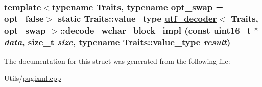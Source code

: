 \hypertarget{structutf__decoder_56b161067860fde1ed534ac3b7399e36}{
\subsubsection[decode\_\-wchar\_\-block\_\-impl]{\setlength{\rightskip}{0pt plus 5cm}template$<$typename Traits, typename opt\_\-swap = opt\_\-false$>$ static Traits::value\_\-type \hyperlink{structutf__decoder}{utf\_\-decoder}$<$ Traits, opt\_\-swap $>$::decode\_\-wchar\_\-block\_\-impl (const uint16\_\-t $\ast$ {\em data}, size\_\-t {\em size}, typename Traits::value\_\-type {\em result})}}
\label{structutf__decoder_56b161067860fde1ed534ac3b7399e36}




The documentation for this struct was generated from the following file:\begin{CompactItemize}
\item 
Utils/\hyperlink{pugixml_8cpp}{pugixml.cpp}\end{CompactItemize}
